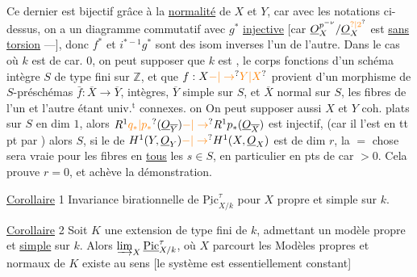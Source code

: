 Ce dernier est bijectif grâce à la
\uline{normalité} de $X$ et $Y$, car  avec
les notations ci-dessus, on a un
diagramme commutatif
avec $g^*$ \uline{injective} [car $\underline{O}_X^{p^{-\nu}}/\underline{O}_X^{\unsure{?|2}}$ est  
\uline{sans torsion} ---], donc $f^*$ et $i^{*-1}g^*$ sont des isom
inverses l'un de l'autre.
Dans le cas où $k$ est de car. $0$, on
peut supposer que $k$ est , le corps  fonctions d'un
schéma intègre $S$ de type fini sur $\mathbb Z$,
et que $f:X\unsure{-|\to}\unsure{Y|X}$ provient d'un
morphisme de $S$-préschémas $\bar f:\overline X\to\overline Y$,
intègres, $\overline Y$ simple sur $S$, et $\overline X$ 
normal sur $S$, les fibres de l'un et
l'autre étant univ.$^{\mathrm t}$ connexes.  on
 On peut
supposer aussi $X$ et $Y$ coh. plats sur
$S$ en dim $1$,  alors
  $R^1\unsure{q_*|p_*}(\underline{O}_{\overline Y})\unsure{-|\to} R^1p_*(\underline{O}_{\overline X})$ est injectif,
 (car il l'est en tt pt
par ) alors  $S$, si
le  de $H^1(Y,\underline{O}_Y)\unsure{-|\to}H^1(X,\underline{O}_X)$
est de dim $r$, la $=$ chose sera
vraie pour les fibres en \uline{tous} les  
$s\in S$, en particulier en  pts de
car $>0$. Cela prouve $r=0$, et achève la
démonstration.

\uline{Corollaire} 1 Invariance birationnelle de $\underline{\mathrm{Pic}}^\tau_{X/k}$
pour $X$ propre et simple sur $k$.

\uline{Corollaire} 2 Soit $K$ une extension
 de type fini de $k$, admettant
un modèle  propre et \uline{simple}
sur $k$. Alors $\varinjlim_X\underline{\mathrm{Pic}}^\tau_{X/k}$, où $X$ parcourt
les Modèles propres et normaux  de $K$
existe au sens  [le système 
est essentiellement constant]

